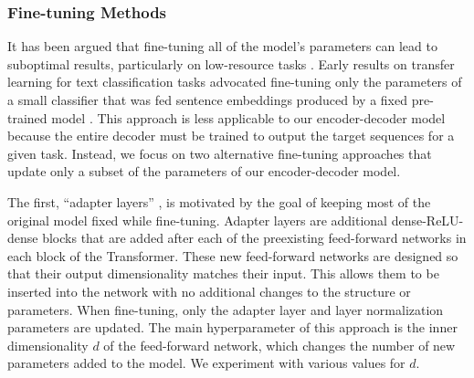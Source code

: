 \documentclass[twoside,11pt]{article}
\begin{document}
\subsubsection{Fine-tuning Methods}

It has been argued that fine-tuning all of the model's parameters can lead to suboptimal results, particularly on low-resource tasks \citep{peters2019tune}.
Early results on transfer learning for text classification tasks advocated fine-tuning only the parameters of a small classifier that was fed sentence embeddings produced by a fixed pre-trained model \citep{subramanian2018learning,kiros2015skip,logeswaran2018efficient,hill2016learning,conneau2017supervised}.
This approach is less applicable to our encoder-decoder model because the entire decoder must be trained to output the target sequences for a given task.
Instead, we focus on two alternative fine-tuning approaches that update only a subset of the parameters of our encoder-decoder model.

The first, ``adapter layers'' \citep{houlsby2019parameter,bapna2019simple}, is motivated by the goal of keeping most of the original model fixed while fine-tuning.
Adapter layers are additional dense-ReLU-dense blocks that are added after each of the preexisting feed-forward networks in each block of the Transformer.
These new feed-forward networks are designed so that their output dimensionality matches their input.
This allows them to be inserted into the network with no additional changes to the structure or parameters.
When fine-tuning, only the adapter layer and layer normalization parameters are updated.
The main hyperparameter of this approach is the inner dimensionality $d$ of the feed-forward network, which changes the number of new parameters added to the model.
We experiment with various values for $d$.
\end{document}
